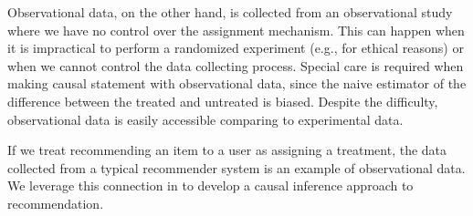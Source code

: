 Observational data, on the other hand, is collected from an observational study where we have no control over the assignment mechanism. This can happen when it is impractical to perform a randomized experiment (e.g., for ethical reasons) or when we cannot control the data collecting process. Special care is required when making causal statement with observational data, since the naive estimator of the difference between the treated and untreated is biased. Despite the difficulty, observational data is easily accessible comparing to experimental data.

If we treat recommending an item to a user as assigning a treatment, the data collected from a typical recommender system is an example of observational data. We leverage this connection in  to develop a causal inference approach to recommendation. 





